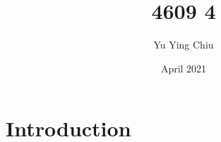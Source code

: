 \documentclass{article}
\title{4609 4}
\author{Yu Ying Chiu}
\date{April 2021}
\begin{document}
\maketitle

\section{Introduction}
\end{document}
